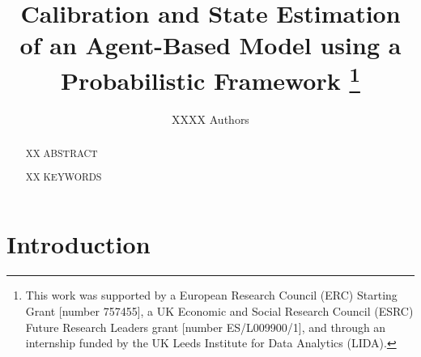\documentclass[11pt]{article}
\begin{document}
%
\title{Calibration and State Estimation of an Agent-Based Model using a Probabilistic Framework
\thanks{This work was supported by a European Research Council (ERC) Starting Grant [number 757455], a UK Economic and Social Research Council (ESRC) Future Research Leaders grant [number ES/L009900/1], and through an internship funded by the UK Leeds Institute for Data Analytics (LIDA).}}

\author{ XXXX Authors } 
%


%
\maketitle              %
%
\begin{abstract}

XX ABSTRACT

XX KEYWORDS
\end{abstract}

\tableofcontents

\newpage

%
%
%
%

\section{Introduction}
\end{document}
